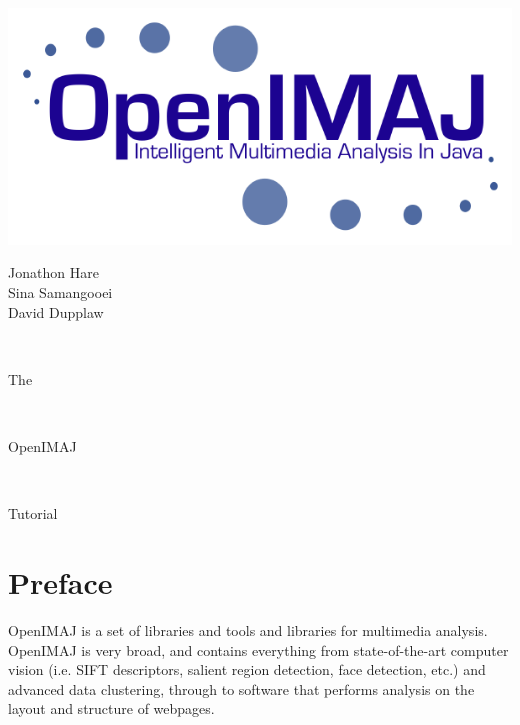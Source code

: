 \documentclass[10pt,a4paper,twoside,extrafontsizes]{memoir}
\newlength\titlepage
\newlength\titlepagefull
\begin{document}
	
\pagestyle{empty}

\begin{minipage}{0.5\titlepage}
\includegraphics{OpenIMAJ.png}
\end{minipage}
\hspace{0.001pt}
\begin{minipage}{0.5\titlepage}
\Huge
\flushright
Jonathon Hare\\
Sina Samangooei\\
David Dupplaw
\end{minipage}
\\[10cm]
\begin{minipage}{\titlepage}
\fontsize{60}{100}\selectfont\flushright The
\end{minipage}
\\[1cm]
\colorbox{nicered}{\parbox{\titlepagefull}{
	\parbox{\titlepage}{
		\color{white}\fontsize{80}{120}\selectfont\flushright OpenIMAJ\\[0.4cm]}
	}
}
\\[0.8cm]
\begin{minipage}{\titlepage}
\fontsize{60}{100}\selectfont\flushright Tutorial
\end{minipage}
\cleardoublepage


\tableofcontents*

\chapter*{Preface}\normalsize
{}
\pagestyle{plain}

OpenIMAJ is a set of libraries and tools and libraries for multimedia analysis. 
OpenIMAJ is very broad, and contains everything from state-of-the-art computer 
vision (i.e. SIFT descriptors, salient region detection, face detection, etc.) 
and advanced data clustering, through to software that performs analysis on the 
layout and structure of webpages.
\end{document}
